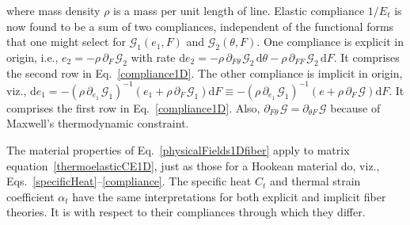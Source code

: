 where mass density $\rho$ is a mass per unit length of line.  Elastic compliance $1/E_t$ is now found to be a sum of two compliances, independent of the functional forms that one might select for $\mathcal{G}_1 ( e_1 , F )$ and $\mathcal{G}_2 ( \theta , F )$.  One compliance is explicit in origin, i.e., $e_2 = -\rho \, \partial_{F\,} \mathcal{G}_2$ with rate $\mathrm{d} e_2 = -\rho \, \partial_{F\theta\,} \mathcal{G}_2 \, \mathrm{d} \theta - \rho \, \partial_{FF\,} \mathcal{G}_2 \, \mathrm{d}F$.  It comprises the second row in Eq.~\ref{compliance1D}.  The other compliance is implicit in origin, viz., $\mathrm{d} e_1 = - ( \rho \, \partial_{e_1 \,} \mathcal{G}_1 )^{-1} ( e_1 + \rho \, \partial_{F\,} \mathcal{G}_1 ) \mathrm{d}F \equiv - ( \rho \, \partial_{e_1 \,} \mathcal{G}_1 )^{-1} ( e + \rho \, \partial_{F\,} \mathcal{G} ) \mathrm{d}F$.  It comprises the first row in Eq.~\ref{compliance1D}. Also, $\partial_{F\theta\,} \mathcal{G} = \partial_{\theta F\,} \mathcal{G}$ because of Maxwell's thermo\-dynamic constraint.

The material properties of Eq.~\ref{physicalFields1Dfiber} apply to matrix equation~\ref{thermoelasticCE1D}, just as those for a Hookean material do, viz., Eqs.~\ref{specificHeat}--\ref{compliance}.  The specific heat $C_t$ and thermal strain coefficient $\alpha_t$ have the same interpretations for both explicit and implicit fiber theories.  It is with respect to their compliances through which they differ.

